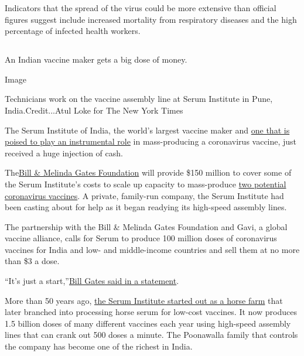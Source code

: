 Indicators that the spread of the virus could be more extensive than
official figures suggest include increased mortality from respiratory
diseases and the high percentage of infected health workers.

\hypertarget{-5}{%
\subsection{}\label{-5}}

An Indian vaccine maker gets a big dose of money.

Image

Technicians work on the vaccine assembly line at Serum Institute in
Pune, India.Credit...Atul Loke for The New York Times

The Serum Institute of India, the world's largest vaccine maker and
\href{https://www.nytimes3xbfgragh.onion/2020/08/01/world/asia/coronavirus-vaccine-india.html}{one
that is poised to play an instrumental role} in mass-producing a
coronavirus vaccine, just received a huge injection of cash.

The\href{https://www.gatesfoundation.org/}{Bill \& Melinda Gates
Foundation} will provide \$150 million to cover some of the Serum
Institute's costs to scale up capacity to mass-produce
\href{https://www.nytimes3xbfgragh.onion/interactive/2020/science/coronavirus-vaccine-tracker.html?action=click\&module=RelatedLinks\&pgtype=Article}{two
potential coronavirus vaccines}. A private, family-run company, the
Serum Institute had been casting about for help as it began readying its
high-speed assembly lines.

The partnership with the Bill \& Melinda Gates Foundation and Gavi, a
global vaccine alliance, calls for Serum to produce 100 million doses of
coronavirus vaccines for India and low- and middle-income countries and
sell them at no more than \$3 a dose.

``It's just a
start,''\href{https://www.gavi.org/news/media-room/100-million-covid-19-vaccine-doses-available-low-and-middle-income-countries-2021}{Bill
Gates said in a statement}.

More than 50 years ago,
\href{https://www.nytimes3xbfgragh.onion/2020/08/01/world/asia/coronavirus-vaccine-india.html}{the
Serum Institute started out as a horse farm} that later branched into
processing horse serum for low-cost vaccines. It now produces 1.5
billion doses of many different vaccines each year using high-speed
assembly lines that can crank out 500 doses a minute. The Poonawalla
family that controls the company has become one of the richest in India.

